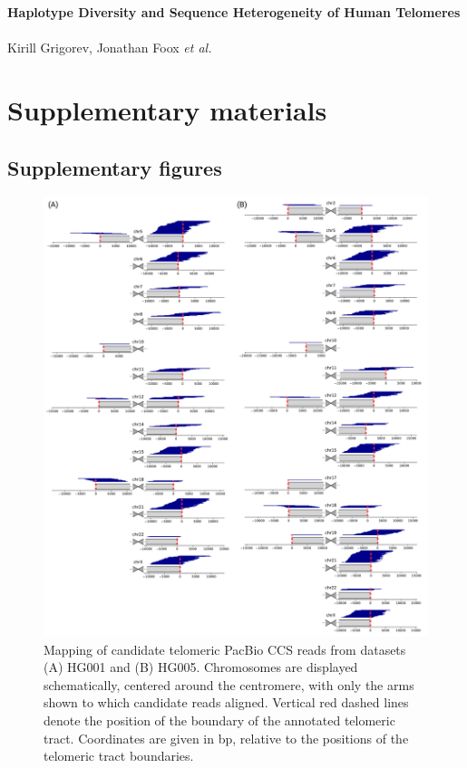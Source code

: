\documentclass{article}
\begin{document}
\singlespacing
{}
\begin{center}
    \Large{\textbf{Haplotype Diversity and Sequence Heterogeneity of Human Telomeres}}
    \\~\\
    \small{Kirill Grigorev, Jonathan Foox \textit{et al.}}
\end{center}
\section*{Supplementary materials}
\doublespacing

\subsection*{Supplementary figures}  \label{sec:supp_figs}

\begin{figure}[ht!] \centering
\includegraphics[height=.65\textheight,width=\textwidth,keepaspectratio]{figures/HG00X-alignments.pdf}
\caption{
    Mapping of candidate telomeric PacBio CCS reads from datasets (A) HG001 and (B) HG005.
    Chromosomes are displayed schematically, centered around the centromere, with only the arms shown to which candidate reads aligned.
    Vertical red dashed lines denote the position of the boundary of the annotated telomeric tract.
    Coordinates are given in bp, relative to the positions of the telomeric tract boundaries.
}
\label{fig:hg00x_alignments}
\end{figure}
\clearpage \pagebreak
\end{document}
